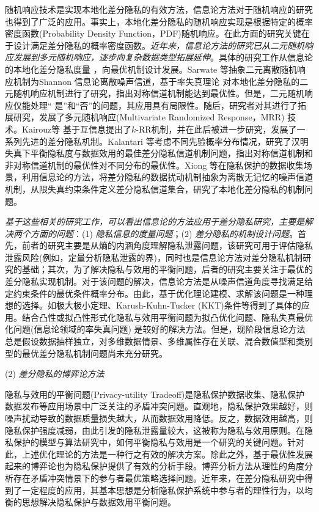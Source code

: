 随机响应技术是实现本地化差分隐私的有效方法，信息论方法对于随机响应的研究也得到了广泛的应用。事实上，本地化差分隐私的随机响应实现是根据特定的概率密度函数(Probability Density Function，PDF)随机响应。在此方面的研究关键在于设计满足差分隐私的概率密度函数。{\em 近年来，信息论方法的研究已从二元随机响应发展到多元随机响应，逐步向复杂数据类型拓展延伸}。具体的研究工作从信息论的本地化差分隐私度量
\cite{lopuhaa-zwakenberg2019information}，向最优机制设计发展。Sarwate 等\cite{sarwate2014a}抽象二元离散随机响应机制为Shannon 信息论\cite{shannon1948a}离散噪声信道，基于率失真理论\cite{cover2006elements} 对本地化差分隐私的二元随机响应机制进行了研究，指出对称信道机制能达到最优性。但是，二元随机响应仅能处理`` 是''和``否''的问题，其应用具有局限性。随后，研究者对其进行了拓展研究，发展了多元随机响应(Multivariate Randomized Response，MRR) 技术。Kairouz等\cite{kairouz2016extremal} 基于互信息提出了$k$-RR机制，并在此后被进一步研究，发展了一系列先进的差分隐私机制。Kalantari 等\cite{kalantari2018robust}考虑不同先验概率分布情况，研究了汉明失真下平衡隐私度与数据效用的最佳差分隐私信道机制问题，指出对称信道机制和非对称信道机制的最优性对不同分布的最优性。Xiong 等\cite{xiong2016randomized}在隐私保护的数据收集场景，利用信息论的方法，将差分隐私的数据扰动机制抽象为离散无记忆的噪声信道机制，从限失真约束条件定义差分隐私信道集合，研究了本地化差分隐私的机制问题。

{\em 基于这些相关的研究工作，可以看出信息论的方法应用于差分隐私研究，主要是解决两个方面的问题}：(1) {\em 隐私信息的度量问题}；(2) {\em 差分隐私的机制设计问题}。首先，前者的研究主要是从熵的内涵角度理解隐私泄露问题，该研究可用于评估隐私泄露风险(例如，定量分析隐私泄露的界)，同时也是信息论方法对差分隐私机制研究的基础；其次，为了解决隐私与效用的平衡问题，后者的研究主要关注于最优的差分隐私实现机制。对于该问题的解决，信息论方法是从噪声信道角度寻找满足给定约束条件的最优条件概率分布。由此，基于优化理论建模\cite{iyengar2019towards}、求解该问题是一种理想的选择。如极大极小定理、Karush-Kuhn-Tucker (KKT)条件等\cite{boyd2004convex}得到了具体的应用。结合凸性或拟凸性形式化隐私与效用平衡问题为拟凸优化问题\cite{xiong2016randomized}、隐私失真最优化问题\cite{wang2016on}(信息论领域的率失真问题)
是较好的解决方法。但是，现阶段信息论方法总是假设数据抽样独立，对多维数据情景、多维属性存在关联、混合数值型和类别型的最优差分隐私机制问题尚未充分研究。

(2) {\em 差分隐私的博弈论方法}

隐私与效用的平衡问题(Privacy-utility Tradeoff)是隐私保护数据收集、隐私保护数据发布等应用场景中广泛关注的矛盾冲突问题。直观地，隐私保护效果越好，则噪声扰动导致的数据质量损失越大，从而数据效用降低。反之，数据效用越高，则隐私保护强度减弱，由此引发的隐私泄露量较大，这被称为隐私与效用原则\cite{sankar2013utility}。在隐私保护的模型与算法研究中，如何平衡隐私与效用是一个研究的关键问题。针对此，上述优化理论的方法是一种行之有效的解决方案。除此之外，基于最优性发展起来的博弈论\cite{Neumann1944The}也为隐私保护提供了有效的分析手段。博弈分析方法从理性的角度分析存在矛盾冲突情景下的参与者最优策略选择问题。近年来，在差分隐私研究中得到了一定程度的应用，其基本思想是分析隐私保护系统中参与者的理性行为，以均衡的思想解决隐私保护与数据效用平衡问题。

